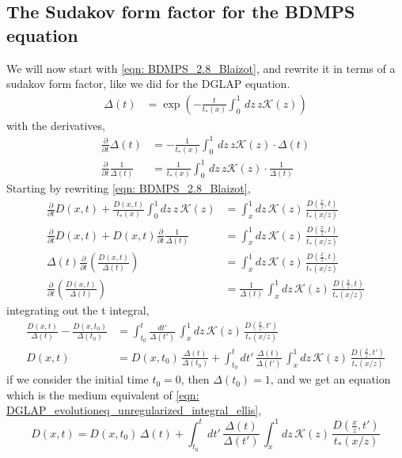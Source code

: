 \documentclass[main.tex]{subfiles}
\begin{document}
\subsection{The Sudakov form factor for the BDMPS equation}\label{sec: medium_sudakov}
We will now start with \autoref{eqn: BDMPS_2.8_Blaizot}, and rewrite it in terms of a sudakov form factor, like we did for the DGLAP equation. 
\begin{align}\label{eqn: BDMPS_sudakov}
    \Delta (t) &= \exp \left( -\frac{t}{t_*(x)} \int_0^1 \, dz\, z \mathcal{K}(z) \right)
\end{align}
with the derivatives, 
\begin{align}
    \frac{\partial}{\partial t} \Delta (t) &= - \frac{1}{t_*(x)} \int_0^1 \, dz\, z \mathcal{K}(z) \cdot \Delta(t) \nonumber\\
    \frac{\partial}{\partial t} \frac{1}{\Delta (t)} &= \frac{1}{t_*(x)} \int_0^1 \, dz\, z \mathcal{K}(z) \cdot \frac{1}{\Delta(t) }
\end{align}
Starting by rewriting \autoref{eqn: BDMPS_2.8_Blaizot},
\begin{align}
    \frac{\partial}{\partial t} D(x,t) + \frac{D\left(x,t\right)}{t_*(x)} \int_0^1 dz\, z\, \mathcal{K}(z) &= \int_x^1 dz\, \mathcal{K}(z)\, \frac{D\left(\frac{x}{z}, t\right)}{t_*(x/z)} \nonumber\\
    \frac{\partial}{\partial t} D(x,t) + D(x,t) \frac{\partial}{\partial t} \frac{1}{\Delta(t)} &= \int_x^1 dz\, \mathcal{K}(z)\, \frac{D\left(\frac{x}{z}, t\right)}{t_*(x/z)} \nonumber\\
    \Delta(t) \frac{\partial}{\partial t} \left( \frac{D(x,t)}{\Delta(t)} \right) &= \int_x^1 dz\, \mathcal{K}(z)\, \frac{D\left(\frac{x}{z}, t\right)}{t_*(x/z)} \nonumber\\
    \frac{\partial}{\partial t} \left( \frac{D(x,t)}{\Delta(t)} \right) &= \frac{1}{\Delta(t)} \, \int_x^1 dz\, \mathcal{K}(z)\, \frac{D\left(\frac{x}{z}, t\right)}{t_*(x/z)} 
\end{align}
integrating out the t integral, 
\begin{align}
    \frac{D(x,t)}{\Delta(t)} - \frac{D(x,t_0)}{\Delta(t_0)} &= \int_{t_0}^t \frac{dt'}{\Delta(t')} \, \int_x^1 dz\, \mathcal{K}(z)\, \frac{D\left(\frac{x}{z}, t'\right)}{t_*(x/z)} \nonumber\\
    D(x,t) &= D(x,t_0)\, \frac{\Delta(t)}{\Delta(t_0)} + \int_{t_0}^t dt' \, \frac{\Delta(t)}{\Delta(t')} \, \int_x^1 dz\, \mathcal{K}(z)\, \frac{D\left(\frac{x}{z}, t'\right)}{t_*(x/z)} 
\end{align}
if we consider the initial time \(t_0 = 0\), then \(\Delta(t_0) = 1\), and we get an equation which is the medium equivalent of \autoref{eqn: DGLAP_evolutioneq_unregularized_integral_ellis}, 
\begin{equation}
    D(x,t) = D(x,t_0)\, \Delta(t) + \int_{t_0}^t dt' \, \frac{\Delta(t)}{\Delta(t')} \, \int_x^1 dz\, \mathcal{K}(z)\, \frac{D\left(\frac{x}{z}, t'\right)}{t_*(x/z)} 
\end{equation}
\end{document}
